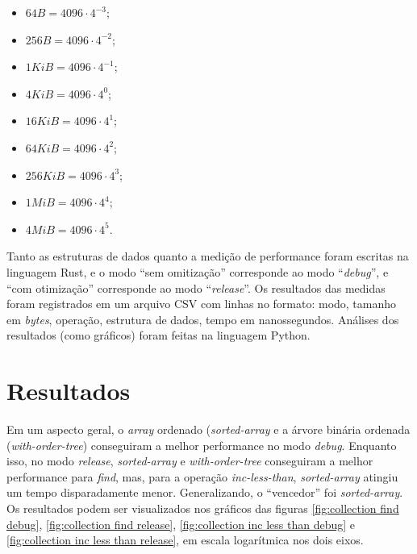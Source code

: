 \documentclass[a4paper]{article}
\begin{document}
\begin{itemize}
    \item $64 B = 4096 \cdot 4^{-3}$;
    \item $256 B = 4096 \cdot 4^{-2}$;
    \item $1 KiB = 4096 \cdot 4^{-1}$;
    \item $4 KiB = 4096 \cdot 4^{0}$;
    \item $16 KiB = 4096 \cdot 4^{1}$;
    \item $64 KiB = 4096 \cdot 4^{2}$;
    \item $256 KiB = 4096 \cdot 4^{3}$;
    \item $1 MiB = 4096 \cdot 4^{4}$;
    \item $4 MiB = 4096 \cdot 4^{5}$.
\end{itemize}

Tanto as estruturas de dados quanto a medição de performance foram escritas na
linguagem Rust, e o modo ``sem omitização'' corresponde ao modo
``\textit{debug}'', e ``com otimização'' corresponde ao modo
``\textit{release}''. Os resultados das medidas foram registrados em um arquivo
CSV com linhas no formato: modo, tamanho em \textit{bytes}, operação, estrutura
de dados, tempo em nanossegundos. Análises dos resultados (como gráficos) foram
feitas na linguagem Python.

\section{Resultados}

Em um aspecto geral, o \textit{array} ordenado (\textit{sorted-array} e a árvore
binária ordenada (\textit{with-order-tree}) conseguiram a melhor performance no
modo \textit{debug}. Enquanto isso, no modo \textit{release},
\textit{sorted-array} e \textit{with-order-tree} conseguiram a melhor
performance para \textit{find}, mas, para a operação \textit{inc-less-than},
\textit{sorted-array} atingiu um tempo disparadamente menor. Generalizando, o
``vencedor'' foi \textit{sorted-array}. Os resultados podem ser visualizados nos
gráficos das figuras \ref{fig:collection find debug},
\ref{fig:collection find release}, \ref{fig:collection inc less than debug} e
\ref{fig:collection inc less than release}, em escala logarítmica nos dois
eixos.
\end{document}
